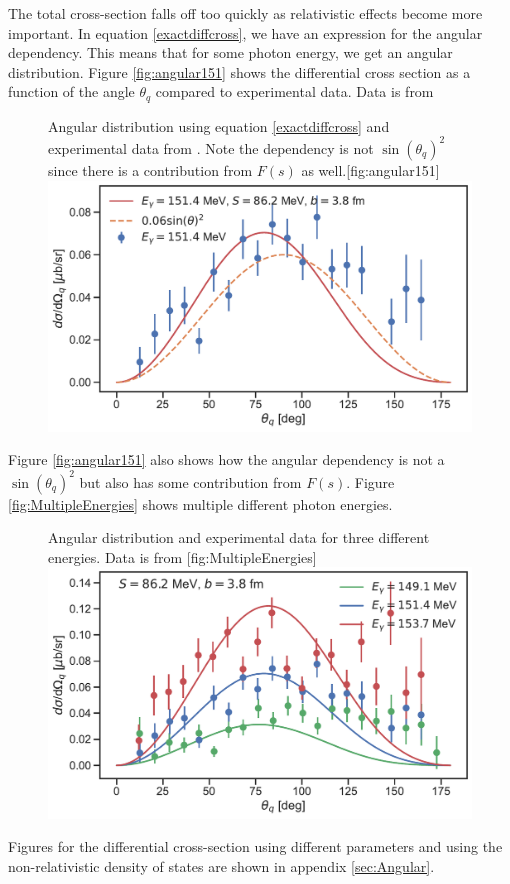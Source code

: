 The total cross-section falls off too quickly as relativistic effects become more important. In equation \eqref{exactdiffcross}, we have an expression for the angular dependency. This means that for some photon energy, we get an angular distribution. Figure \ref{fig:angular151} shows the differential cross section as a function of the angle $\theta_q$ compared to experimental data. Data is from \cite{BeckPion}  
\begin{figure}[H]
	\begin{sidecaption}{Angular distribution using equation \eqref{exactdiffcross} and experimental data from \cite{BeckPion}.  Note the dependency is not $\sin(\theta_q)^2$ since there is a contribution from $F(s)$ as well.}[fig:angular151]
		\includegraphics[width=\linewidth]{Figures/DiffCross151_rel.pdf}
	\end{sidecaption}
\end{figure}
Figure \ref{fig:angular151} also shows how the angular dependency is not a $\sin(\theta_q)^2$ but also has some contribution from $F(s)$. Figure \ref{fig:MultipleEnergies} shows multiple different photon energies.
\begin{figure}[H]
	\begin{sidecaption}{Angular distribution and experimental data for three different energies. Data is from \cite{BeckPion}}[fig:MultipleEnergies]
		\includegraphics[width=\linewidth]{Figures/MultiDiffcross_rel.pdf}
	\end{sidecaption}
\end{figure}
Figures for the differential cross-section using different parameters and using the non-relativistic density of states are shown in appendix \ref{sec:Angular}.

